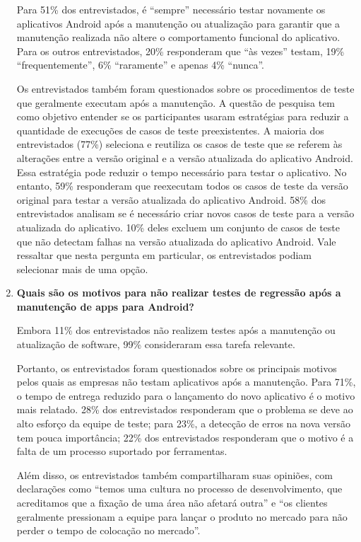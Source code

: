 \begin{enumerate}[label=\bf QP\arabic*]
Para 51\% dos entrevistados, é ``sempre'' necessário testar novamente os aplicativos Android após a manutenção ou atualização para garantir que a manutenção realizada não altere o comportamento funcional do aplicativo. Para os outros entrevistados, 20\% responderam que ``às vezes'' testam, 19\% ``frequentemente'', 6\% ``raramente'' e apenas 4\% ``nunca''.

Os entrevistados também foram questionados sobre os procedimentos de teste que geralmente executam após a manutenção. A questão de pesquisa tem como objetivo entender se os participantes usaram estratégias para reduzir a quantidade de execuções de casos de teste preexistentes. A maioria dos entrevistados (77\%) seleciona e reutiliza os casos de teste que se referem às alterações entre a versão original e a versão atualizada do aplicativo Android. Essa estratégia pode reduzir o tempo necessário para testar o aplicativo. No entanto, 59\% responderam que reexecutam todos os casos de teste da versão original para testar a versão atualizada do aplicativo Android. 58\% dos entrevistados analisam se é necessário criar novos casos de teste para a versão atualizada do aplicativo. 10\% deles excluem um conjunto de casos de teste que não detectam falhas na versão atualizada do aplicativo Android. Vale ressaltar que nesta pergunta em particular, os entrevistados podiam selecionar mais de uma opção.

    
\item \textbf{Quais são os motivos para não realizar testes de regressão após a manutenção de apps para Android?}

Embora 11\% dos entrevistados não realizem testes após a manutenção ou atualização de software, 99\% consideraram essa tarefa relevante.
 
Portanto, os entrevistados foram questionados sobre os principais motivos pelos quais as empresas não testam aplicativos após a manutenção. Para 71\%, o tempo de entrega reduzido para o lançamento do novo aplicativo é o motivo mais relatado. 28\% dos entrevistados responderam que o problema se deve ao alto esforço da equipe de teste; para 23\%, a detecção de erros na nova versão tem pouca importância; 22\% dos entrevistados responderam que o motivo é a falta de um processo suportado por ferramentas.

Além disso, os entrevistados também compartilharam suas opiniões, com declarações como ``temos uma cultura no processo de desenvolvimento, que acreditamos que a fixação de uma área não afetará outra'' e ``os clientes geralmente pressionam a equipe para lançar o produto no mercado para não perder o tempo de colocação no mercado''.



\end{enumerate}

